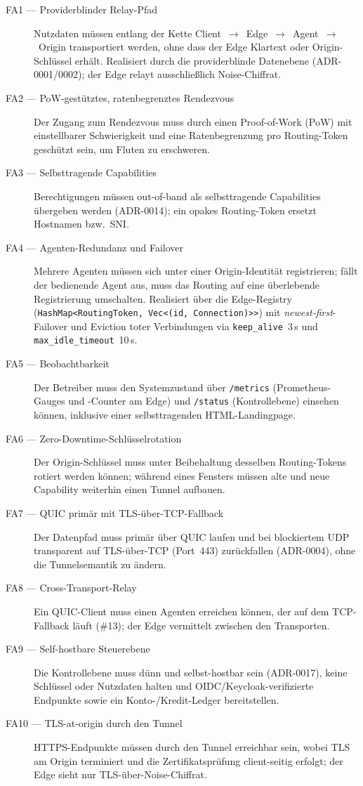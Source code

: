 \begin{description}
  \item[FA1 --- Providerblinder Relay-Pfad] Nutzdaten müssen entlang der Kette
    Client~$\rightarrow$~Edge~$\rightarrow$~Agent~$\rightarrow$~Origin transportiert
    werden, ohne dass der Edge Klartext oder Origin-Schlüssel erhält. Realisiert durch
    die providerblinde Datenebene (ADR-0001/0002); der Edge relayt ausschließlich
    Noise-Chiffrat.
  \item[FA2 --- PoW-gestütztes, ratenbegrenztes Rendezvous] Der Zugang zum Rendezvous
    muss durch einen Proof-of-Work (PoW) mit einstellbarer Schwierigkeit und eine
    Ratenbegrenzung pro Routing-Token geschützt sein, um Fluten zu erschweren.
  \item[FA3 --- Selbsttragende Capabilities] Berechtigungen müssen out-of-band als
    selbsttragende Capabilities übergeben werden (ADR-0014); ein opakes Routing-Token
    ersetzt Hostnamen bzw.\ SNI.
  \item[FA4 --- Agenten-Redundanz und Failover] Mehrere Agenten müssen sich unter einer
    Origin-Identität registrieren; fällt der bedienende Agent aus, muss das Routing auf
    eine überlebende Registrierung umschalten. Realisiert über die Edge-Registry
    (\texttt{HashMap<RoutingToken, Vec<(id, Connection)>>}) mit \emph{newest-first}-Failover
    und Eviction toter Verbindungen via \texttt{keep\_alive}~3\,s und
    \texttt{max\_idle\_timeout}~10\,s.
  \item[FA5 --- Beobachtbarkeit] Der Betreiber muss den Systemzustand über
    \texttt{/metrics} (Prometheus-Gauges und -Counter am Edge) und \texttt{/status}
    (Kontrollebene) einsehen können, inklusive einer selbsttragenden HTML-Landingpage.
  \item[FA6 --- Zero-Downtime-Schlüsselrotation] Der Origin-Schlüssel muss unter
    Beibehaltung desselben Routing-Tokens rotiert werden können; während eines Fensters
    müssen alte und neue Capability weiterhin einen Tunnel aufbauen.
  \item[FA7 --- QUIC primär mit TLS-über-TCP-Fallback] Der Datenpfad muss primär über
    QUIC laufen und bei blockiertem UDP transparent auf TLS-über-TCP (Port~443)
    zurückfallen (ADR-0004), ohne die Tunnelsemantik zu ändern.
  \item[FA8 --- Cross-Transport-Relay] Ein QUIC-Client muss einen Agenten erreichen
    können, der auf dem TCP-Fallback läuft (\#13); der Edge vermittelt zwischen den
    Transporten.
  \item[FA9 --- Self-hostbare Steuerebene] Die Kontrollebene muss dünn und
    selbst-hostbar sein (ADR-0017), keine Schlüssel oder Nutzdaten halten und
    OIDC/Keycloak-verifizierte Endpunkte sowie ein Konto-/Kredit-Ledger bereitstellen.
  \item[FA10 --- TLS-at-origin durch den Tunnel] HTTPS-Endpunkte müssen durch den Tunnel
    erreichbar sein, wobei TLS am Origin terminiert und die Zertifikatsprüfung
    client-seitig erfolgt; der Edge sieht nur TLS-über-Noise-Chiffrat.
\end{description}

